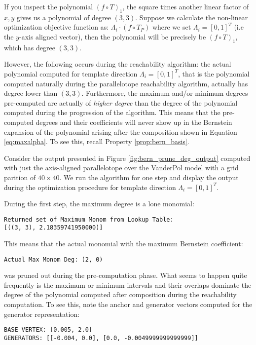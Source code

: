 If you inspect the polynomial $(f \circ T)_1$, the square times another linear factor of $x,y$ gives us a polynomial of degree $(3,3)$.
%
Suppose we calculate the non-linear optimization objective function as: $\Lambda_i \cdot (f \circ T_P)$ where we set $\Lambda_i = [0,1]^T$ (i.e the $y$-axis aligned vector), then the polynomial will be precisely be $(f \circ T)_1$, which has degree $(3,3)$.

However, the following occurs during the reachability algorithm: the actual polynomial computed for template direction $\Lambda_i =[0,1]^T$, that is the polynomial computed naturally during the parallelotope reachability algorithm, actually has degree lower than $(3,3)$.
%
Furthermore, the maximum and/or minimum degrees pre-computed are actually of \emph{higher degree} than the degree of the polynomial computed during the progression of the algorithm. This means that the pre-computed degrees and their coefficients will never show up in the Bernstein expansion of the polynomial arising after the composition shown in Equation \ref{eq:maxalpha}. To see this, recall Property \ref{prop:bern_basis}.

Consider the output presented in Figure \ref{fig:bern_prune_deg_output} computed with just the axis-aligned parallelotope over the VanderPol model with a grid parition of $40 \times 40$. We run the algorithm for one step and display the output during the optimization procedure for template direction $\Lambda_i = [0,1]^T$.

During the first step, the maximum degree is a lone monomial:
%
\begin{verbatim}
Returned set of Maximum Monom from Lookup Table:
[((3, 3), 2.18359741950000)]
\end{verbatim}
%
This means that the actual monomial with the maximum Bernstein coefficient:
\begin{verbatim}
Actual Max Monom Deg: (2, 0)
\end{verbatim}
%
was pruned out during the pre-computation phase.
%
What seems to happen quite frequently is the maximum or minimum intervals and their overlaps dominate the degree of the polynomial computed after composition during the reachability computation. To see this, note the anchor and generator vectors computed for the generator representation:
%
\begin{verbatim}
BASE VERTEX: [0.005, 2.0]
GENERATORS: [[-0.004, 0.0], [0.0, -0.0049999999999999]]
\end{verbatim}

